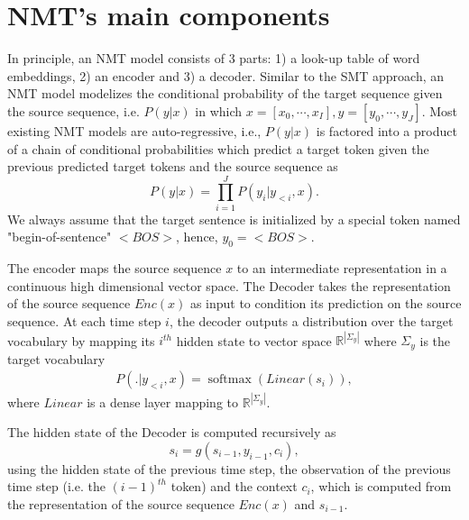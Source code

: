 \section{NMT's main components}
In principle, an NMT model consists of 3 parts: 1) a look-up table of word embeddings, 2) an encoder and 3) a decoder. Similar to the SMT approach, an NMT model modelizes the conditional probability of the target sequence given the source sequence, i.e. $P(y|x)$ in which $x=[x_0,\cdots,x_{I}], y=[y_0,\cdots,y_{J}]$. Most existing NMT models are auto-regressive, i.e., $P(y|x)$ is factored into a product of a chain of conditional probabilities which predict a target token given the previous predicted target tokens and the source sequence as
\begin{equation}
P(y|x) = \displaystyle{\mathop{\prod}_{i=1}^{J}} P(y_i|y_{<i},x).
\label{eq:factorization-chap2}
\end{equation}
We always assume that the target sentence is initialized by a special token named "begin-of-sentence" $<BOS>$, hence, $y_{0}=<BOS>$. 

The encoder maps the source sequence $x$ to an intermediate representation in a continuous high dimensional vector space. The Decoder takes the representation of the source sequence $Enc(x)$ as input to condition its prediction on the source sequence. At each time step $i$, the decoder outputs a distribution over the target vocabulary by mapping its $i^{th}$ hidden state to vector space $\mathbb{R}^{|\Sigma_y|}$ where $\Sigma_y$ is the target vocabulary
\begin{equation}
\begin{array}{rcl}
P(.|y_{<i},x) = \operatorname{softmax}(Linear(s_i)),
\end{array}
\end{equation}
where $Linear$ is a dense layer mapping to $\mathbb{R}^{|\Sigma_y|}$.

The hidden state of the Decoder is computed recursively as 
\begin{equation}
s_i = g(s_{i-1},y_{i-1},c_i),
\end{equation}
using the hidden state of the previous time step, the observation of the previous time step (i.e. the $(i-1)^{th}$ token) and the context $c_i$, which is computed from the representation of the source sequence $Enc(x)$ and $s_{i-1}$.

